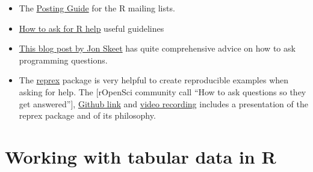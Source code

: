 \documentclass[]{book}
\providecommand{\tightlist}{%
  \setlength{\itemsep}{0pt}\setlength{\parskip}{0pt}}
\theoremstyle{definition}
\theoremstyle{definition}
\theoremstyle{remark}
\begin{document}
\begin{itemize}
\tightlist
\item
  The \href{http://www.r-project.org/posting-guide.html}{Posting Guide}
  for the R mailing lists.
\item
  \href{http://blog.revolutionanalytics.com/2014/01/how-to-ask-for-r-help.html}{How
  to ask for R help} useful guidelines
\item
  \href{http://codeblog.jonskeet.uk/2010/08/29/writing-the-perfect-question/}{This
  blog post by Jon Skeet} has quite comprehensive advice on how to ask
  programming questions.
\item
  The \href{https://cran.rstudio.com/web/packages/reprex/}{reprex}
  package is very helpful to create reproducible examples when asking
  for help. The {[}rOpenSci community call ``How to ask questions so
  they get answered''{]},
  \href{https://github.com/ropensci/commcalls/issues/14}{Github link}
  and \href{https://vimeo.com/208749032}{video recording} includes a
  presentation of the reprex package and of its philosophy.
\end{itemize}

\chapter{Working with tabular data in R}\label{data}
\end{document}
